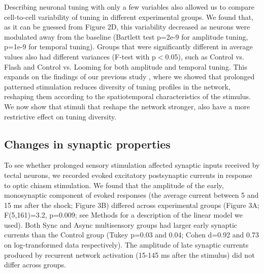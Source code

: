 \documentclass{article}
\begin{document}
Describing neuronal tuning with only a few variables also allowed us to compare cell-to-cell variability of tuning in different experimental groups. We found that, as it can be guessed from Figure 2D, this variability decreased as neurons were modulated away from the baseline (Bartlett test p=2e-9 for amplitude tuning, p=1e-9 for temporal tuning). Groups that were significantly different in average values also had different variances (F-test with p$<$0.05), such as Control vs. Flash and Control vs. Looming for both amplitude and temporal tuning. This expands on the findings of our previous study \citep{ciarleglio2015}, where we showed that prolonged patterned stimulation reduces diversity of tuning profiles in the network, reshaping them according to the spatiotemporal characteristics of the stimulus. We now show that stimuli that reshape the network stronger, also have a more restrictive effect on tuning diversity.

\subsection*{Changes in synaptic properties}

To see whether prolonged sensory stimulation affected synaptic inputs received by tectal neurons, we recorded evoked excitatory postsynaptic currents in response to optic chiasm stimulation. We found that the amplitude of the early, monosynaptic component of evoked responses (the average current between 5 and 15 ms after the shock; Figure 3B) differed across experimental groups (Figure 3A; F(5,161)=3.2, p=0.009; see Methods for a description of the linear model we used). Both Sync and Async multisensory groups had larger early synaptic currents than the Control group (Tukey p=0.03 and 0.04; Cohen d=0.92 and 0.73 on log-transformed data respectively). The amplitude of late synaptic currents produced by recurrent network activation (15-145 ms after the stimulus) did not differ across groups.
\end{document}
